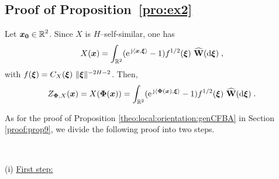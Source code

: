 \documentclass{elsarticle}
\def\R{\mbox{$\mathbb{R}$}}
\begin{document}
\subsection{Proof of Proposition~\ref{pro:ex2}\\}\label{s:proof:pro:ex2}

Let $\vect{x_0}\in \R^2$. Since $X$ is $H$--self-similar, one has 
\[
X(\bm{x})=\int_{\mathbb{R}^2}(\mathrm{e}^{\, \mathrm{j} \langle \bm{x},\bm{\xi}\rangle}-1)f^{1/2}(\bm{\xi})~\widehat{\mathbf{W}}(\mathop{}\mathopen{}\mathrm{d} \bm{\xi})\;,
\]
with $f(\bm{\xi})=C_X(\bm{\xi}) ~ \lVert \bm{\xi}\rVert^{-2H-2}$. Then,
$$
Z_{\mathbf{\Phi},X}(\bm{x})=X(\mathbf{\Phi}(\bm{x}))=\int_{\mathbb{R}^2}(\mathrm{e}^{\, \mathrm{j} \langle \mathbf{\Phi}(\bm{x}),\bm{\xi}\rangle}-1)f^{1/2}(\bm{\xi})~\widehat{\mathbf{W}}(\mathop{}\mathopen{}\mathrm{d} \bm{\xi})\;.
$$

As for the proof of Proposition \ref{theo:local:orientation:genCFBA} in Section \ref{proof:prop9}, we divide the following proof into two steps.

\

\noindent (i) \underline{First step:} 

\
\end{document}
